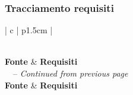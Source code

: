 
\subsubsection{Tracciamento requisiti}\label{sec:tracciamento}
\begin{center}
    \begin{longtable}{ | c | p{1.5cm} |}
    \caption{Tabella tracciamento requisiti - casi d'uso} \\
    \hline 
    \textbf{Fonte} & \textbf{Requisiti}  \\ \hline
\endfirsthead
{}%
{\tablename\ \thetable\ -- \textit{Continued from previous page}} \\
\hline
 \textbf{Fonte} & \textbf{Requisiti} \\
\hline
\endhead
\hline {} \\
\endfoot
\hline
\endlastfoot

\end{longtable}
\end{center}
